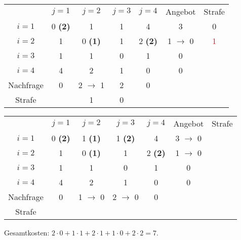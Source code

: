 \documentclass{article}
\begin{document}
	\begin{center}
		\begin{tabular}{c|cccc|cc}
			& \cellcolor{blue!30}$j=1$ & $j=2$ & $j=3$ & \cellcolor{blue!30}$j=4$ & Angebot & Strafe \\
			\cline{1-6}
			$i=1$ & \cellcolor{blue!30}0 \textbf{(2)} & 1 & 1 & \cellcolor{blue!30}4 & 3 & 0 \\
			$i=2$ & \cellcolor{blue!30}1 & 0 \textbf{(1)} & 1 & \cellcolor{blue!30}2 \textbf{(2)} & 1 $\to$ 0 & \textcolor{red}{1} \\
			\rowcolor{blue!30}$i=3$ & \cellcolor{blue!30}1 & 1 & 0 & \cellcolor{blue!30}1 & 0 & \\
			\rowcolor{blue!30}$i=4$ & \cellcolor{blue!30}4 & 2 & 1 & \cellcolor{blue!30}0 & 0 & \\
			\cline{1-6}
			Nachfrage & \cellcolor{blue!30}0 & 2 $\to$ 1 & 2 & \cellcolor{blue!30}0 & & \\
			Strafe & \cellcolor{blue!30} & 1 & 0 & \cellcolor{blue!30} & &
		\end{tabular}
	\end{center}
	\begin{center}
		\begin{tabular}{c|cccc|cc}
			& \cellcolor{blue!30}$j=1$ & $j=2$ & $j=3$ & \cellcolor{blue!30}$j=4$ & Angebot & Strafe \\
			\cline{1-6}
			$i=1$ & \cellcolor{blue!30}0 \textbf{(2)} & 1 \textbf{(1)} & 1 \textbf{(2)} & \cellcolor{blue!30}4 & 3 $\to$ 0 & \\
			\rowcolor{blue!30}$i=2$ & \cellcolor{blue!30}1 & 0 \textbf{(1)} & 1 & \cellcolor{blue!30}2 \textbf{(2)} & 1 $\to$ 0 & \\
			\rowcolor{blue!30}$i=3$ & \cellcolor{blue!30}1 & 1 & 0 & \cellcolor{blue!30}1 & 0 & \\
			\rowcolor{blue!30}$i=4$ & \cellcolor{blue!30}4 & 2 & 1 & \cellcolor{blue!30}0 & 0 & \\
			\cline{1-6}
			Nachfrage & \cellcolor{blue!30}0 & 1 $\to$ 0 & 2 $\to$ 0 & \cellcolor{blue!30}0 & & \\
			Strafe & \cellcolor{blue!30} & & & \cellcolor{blue!30} & &
		\end{tabular}
	\end{center}
	Gesamtkosten: $2\cdot 0 + 1\cdot 1 + 2\cdot 1 + 1\cdot 0 + 2\cdot 2 = 7$.
\end{document}
